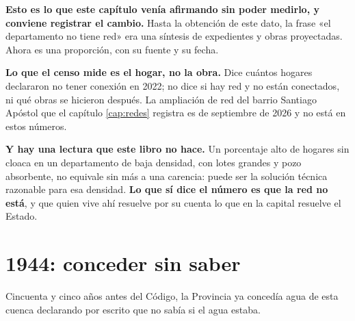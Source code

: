 \begin{cautela}
\textbf{Esto es lo que este capítulo venía afirmando sin poder medirlo, y conviene registrar el
cambio.} Hasta la obtención de este dato, la frase «el departamento no tiene red» era una
síntesis de expedientes y obras proyectadas. Ahora es una proporción, con su fuente y su fecha.

\textbf{Lo que el censo mide es el hogar, no la obra.} Dice cuántos hogares declararon no tener
conexión en 2022; no dice si hay red y no están conectados, ni qué obras se hicieron después. La
ampliación de red del barrio Santiago Apóstol que el capítulo \ref{cap:redes} registra es de
septiembre de 2026 y no está en estos números.

\textbf{Y hay una lectura que este libro no hace.} Un porcentaje alto de hogares sin cloaca en
un departamento de baja densidad, con lotes grandes y pozo absorbente, no equivale sin más a una
carencia: puede ser la solución técnica razonable para esa densidad. \textbf{Lo que sí dice el
número es que la red no está}, y que quien vive ahí resuelve por su cuenta lo que en la capital
resuelve el Estado.
\end{cautela}

\section{1944: conceder sin saber}

Cincuenta y cinco años antes del Código, la Provincia ya concedía agua de esta cuenca
declarando por escrito que no sabía si el agua estaba.

